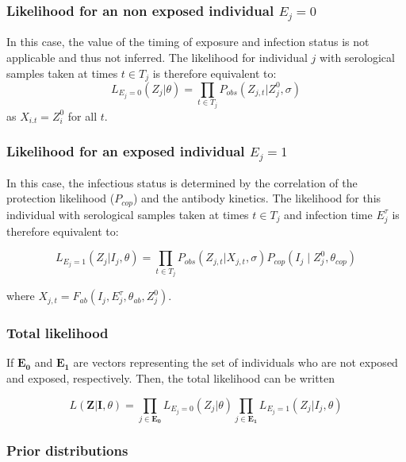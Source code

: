 \subsubsection{Likelihood for an non exposed individual $E_j = 0$} 
In this case, the value of the timing of exposure and infection status is not applicable and thus not inferred. The likelihood for individual $j$ with serological samples taken at times $t\in T_j$ is therefore equivalent to:
\begin{equation}
L_{E_j = 0}(Z_{j}| \theta) = \prod_{t \in T_j}P_{obs}(Z_{j,t}|Z^0_{j}, \sigma)
\end{equation}
as $X_{i.t} = Z^0_{i}$ for all $t$.


\subsubsection{Likelihood for an exposed individual $E_j = 1$}
In this case, the infectious status is determined by the correlation of the protection likelihood ($P_{cop}$) and the antibody kinetics. The likelihood for this individual with serological samples taken at times $t\in T_j$ and infection time $E^\tau_j$ is therefore equivalent to:

\begin{equation}
L_{E_j = 1}(Z_{j}| I_j, \theta) = \prod_{t \in T_j}P_{obs}(Z_{j,t}| X_{j,t}, \sigma)P_{cop}(I_j \mid Z_{j}^0, \theta_{cop})
\end{equation}

where $X_{j,t} = F_{ab}( I_j,  E_j^\tau, \theta_{ab}, Z^0_j)$.


\subsubsection{Total likelihood}

If $\mathbf{E_0}$ and $\mathbf{E_1}$ are vectors representing the set of individuals who are not exposed and exposed, respectively. Then, the total likelihood can be written 

\begin{equation}
L(\mathbf{Z} | \mathbf{I}, \theta) = \prod_{j \in \mathbf{E_0}}L_{E_j = 0}(Z_{j}| \theta) \prod_{j \in \mathbf{E_1}}L_{E_j = 1}(Z_{j}| I_j, \theta) 
\end{equation}


\subsubsection{Prior distributions}

